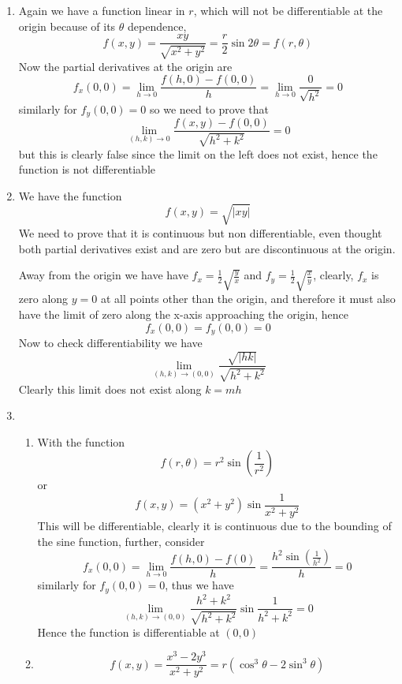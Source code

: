 \documentclass[12pt]{article}
\begin{document}
\begin{enumerate}
\begin{enumerate}
\end{enumerate}

\item
Again we have a function linear in $r$, which will not be differentiable at the origin because of its $\theta$ dependence, 
$$
f(x,y) = \frac{xy}{\sqrt{ x^{2} + y^{2} }} = \frac{r}{2}\sin 2\theta = f(r,\theta)
$$
Now the partial derivatives at the origin are 
$$
f_{x}(0,0) = \lim_{ h \to 0 } \frac{f(h,0)-f(0,0)}{h} = \lim_{ h \to 0 } \frac{0}{\sqrt{ h^{2}  }} = 0
$$
similarly for $f_{y}(0,0) = 0$ so we need to prove that
$$
\lim_{ (h,k) \to 0 } \frac{f(x,y)-f(0,0)}{\sqrt{ h^{2} + k^{2} }} = 0
$$
but this is clearly false since the limit on the left does not exist, hence the function is not differentiable

\item
We have the function
$$
f(x,y) = \sqrt{ |xy| }
$$
We need to prove that it is continuous but non differentiable, even thought both partial derivatives exist and are zero but are discontinuous at the origin.

Away from the origin we have have $f_{x} = \frac{1}{2}\sqrt{ \frac{y}{x} }$ and $f_{y} = \frac{1}{2}\sqrt{ \frac{x}{y} }$, clearly, $f_{x}$ is zero along $y=0$ at all points other than the origin, and therefore it must also have the limit of zero along the x-axis approaching the origin, hence 
$$
f_{x}(0,0)=f_{y}(0,0) = 0
$$
Now to check differentiability we have
$$
\lim_{ (h,k) \to (0,0) } \frac{\sqrt{ |hk| }}{\sqrt{ h^{2} + k^{2} }}
$$
Clearly this limit does not exist along $k=mh$

\item
\begin{enumerate}
\item
With the function
$$
f(r, \theta) = r^{2} \sin \left( \frac{1}{r^{2}} \right)
$$
or
$$
f(x,y) = (x^{2} + y^{2})\sin \frac{1}{x^{2} + y^{2}}
$$
This will be differentiable, clearly it is continuous due to the bounding of the sine function, further, consider 
$$
f_{x}(0,0) = \lim_{ h \to 0 } \frac{f(h,0)-f(0)}{h} = \frac{h^{2} \sin\left( \frac{1}{h^{2}} \right)}{h} = 0
$$
similarly for $f_{y}(0,0)=0$, thus we have
$$
\lim_{ (h,k) \to (0,0) } \frac{h^{2} + k^{2}}{\sqrt{ h^{2} + k^{2} }}\sin \frac{1}{h^{2} + k^{2}} = 0
$$
Hence the function is differentiable at $(0,0)$
\item
$$
f(x,y) = \frac{x^{3}-2y^{3}}{x^{2} + y^{2}} = r (\cos ^{3} \theta - 2\sin ^{3} \theta)
$$

\end{enumerate}


\end{enumerate}
\end{document}
